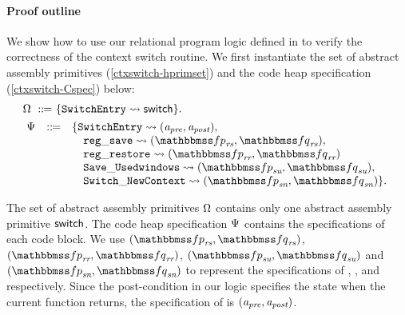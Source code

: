 \paragraph{\textbf{Proof outline}} We show how to use
our relational program logic defined in
\Fig{\ref{fig:Selected Inference Rules for Refinement Verification}}
to verify the correctness of the context switch routine.
We first instantiate the set of
abstract assembly primitives (\ref{ctxswitch-hprimset})
and the code heap specification (\ref{ctxswitch-Cspec})
below:
\begin{align}
    & \hprimset \ \define \ \{ \SwitchEntry \leadsto
        \primsw \}.
        \label{ctxswitch-hprimset} \\
    & \!\begin{array}{lcl}
        \Cspec & \define &
        \{ \SwitchEntry \leadsto (\Apre, \Apost), \\
        & & \quad
        \regsave \leadsto
        (\relspecpre_{\textit{rs}}, \relspecpost_{\textit{rs}}),\\
        & & \quad
        \regrestore \leadsto
        (\relspecpre_{\textit{rr}}, \relspecpost_{\textit{rr}}) \\
        & & \quad
        \SaveUsedWin{} \leadsto (\relspecpre_{\textit{su}}, \relspecpost_{\textit{su}}), \\
        & & \quad
        \SwitchNewTask{} \leadsto (\relspecpre_{\textit{sn}}, \relspecpost_{\textit{sn}})
        \}.
        \label{ctxswitch-Cspec}
    \end{array}
\end{align}

The set of abstract assembly primitives $\Omega$
contains only one abstract assembly primitive $\mathsf{switch}$.
The code heap specification $\Psi{}$
contains the specifications of each code block.
We use
$(\relspecpre_{\textit{rs}}, \relspecpost_{\textit{rs}})$,
$(\relspecpre_{\textit{rr}}, \relspecpost_{\textit{rr}})$,
$(\relspecpre_{\textit{su}}, \relspecpost_{\textit{su}})$ and
$(\relspecpre_{\textit{sn}}, \relspecpost_{\textit{sn}})$
to represent the specifications of
\regsave{}, \regrestore{},
\SaveUsedWin{} and \SwitchNewTask{} respectively.
Since the post-condition in our logic specifies the
state when the current function returns,
the specification of \SwitchEntry{} is $(\textit{a}_\textit{pre}, \textit{a}_\textit{post})$.

